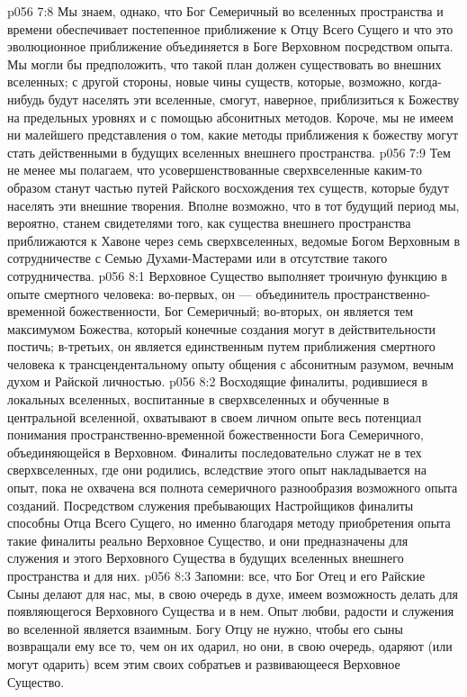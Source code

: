 \vs p056 7:8 Мы знаем, однако, что Бог Семеричный во вселенных пространства и времени обеспечивает постепенное приближение к Отцу Всего Сущего и что это эволюционное приближение объединяется в Боге Верховном посредством опыта. Мы могли бы предположить, что такой план должен существовать во внешних вселенных; с другой стороны, новые чины существ, которые, возможно, когда\hyp{}нибудь будут населять эти вселенные, смогут, наверное, приблизиться к Божеству на предельных уровнях и с помощью абсонитных методов. Короче, мы не имеем ни малейшего представления о том, какие методы приближения к божеству могут стать действенными в будущих вселенных внешнего пространства.
\vs p056 7:9 Тем не менее мы полагаем, что усовершенствованные сверхвселенные каким\hyp{}то образом станут частью путей Райского восхождения тех существ, которые будут населять эти внешние творения. Вполне возможно, что в тот будущий период мы, вероятно, станем свидетелями того, как существа внешнего пространства приближаются к Хавоне через семь сверхвселенных, ведомые Богом Верховным в сотрудничестве с Семью Духами\hyp{}Мастерами или в отсутствие такого сотрудничества.
\vs p056 8:1 Верховное Существо выполняет троичную функцию в опыте смертного человека: во\hyp{}первых, он --- объединитель пространственно\hyp{}временной божественности, Бог Семеричный; во\hyp{}вторых, он является тем максимумом Божества, который конечные создания могут в действительности постичь; в\hyp{}третьих, он является единственным путем приближения смертного человека к трансцендентальному опыту общения с абсонитным разумом, вечным духом и Райской личностью.
\vs p056 8:2 Восходящие финалиты, родившиеся в локальных вселенных, воспитанные в сверхвселенных и обученные в центральной вселенной, охватывают в своем личном опыте весь потенциал понимания пространственно\hyp{}временной божественности Бога Семеричного, объединяющейся в Верховном. Финалиты последовательно служат не в тех сверхвселенных, где они родились, вследствие этого опыт накладывается на опыт, пока не охвачена вся полнота семеричного разнообразия возможного опыта созданий. Посредством служения пребывающих Настройщиков финалиты способны  Отца Всего Сущего, но именно благодаря методу приобретения опыта такие финалиты реально  Верховное Существо, и они предназначены для служения и  этого Верховного Существа в будущих вселенных внешнего пространства и для них.
\vs p056 8:3 Запомни: все, что Бог Отец и его Райские Сыны делают для нас, мы, в свою очередь в духе, имеем возможность делать для появляющегося Верховного Существа и в нем. Опыт любви, радости и служения во вселенной является взаимным. Богу Отцу не нужно, чтобы его сыны возвращали ему все то, чем он их одарил, но они, в свою очередь, одаряют (или могут одарить) всем этим своих собратьев и развивающееся Верховное Существо.

